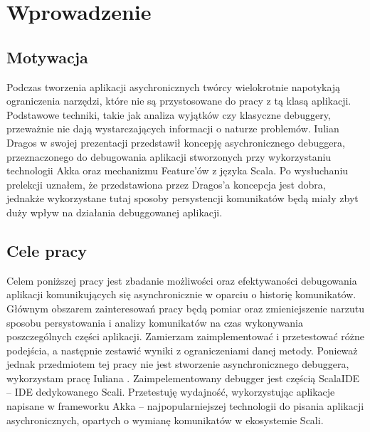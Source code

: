 \chapter{Wprowadzenie}


\section{Motywacja}

Podczas tworzenia aplikacji asychronicznych twórcy wielokrotnie napotykają ograniczenia narzędzi, które nie są przystosowane do pracy z tą klasą aplikacji. Podstawowe techniki, takie jak analiza wyjątków czy klasyczne debuggery, przeważnie nie dają wystarczających informacji o naturze problemów. Iulian Dragos w swojej prezentacji \cite{rethingningDebugger} przedstawił koncepję asychronicznego debuggera, przeznaczonego do debugowania aplikacji stworzonych przy wykorzystaniu technologii Akka oraz mechanizmu Feature'ów z języka Scala. Po wysłuchaniu prelekcji uznałem, że przedstawiona przez Dragos'a koncepcja jest dobra, jednakże wykorzystane tutaj sposoby persystencji komunikatów będą miały zbyt duży wpływ na działania debuggowanej aplikacji.



\section{Cele pracy}


Celem poniższej pracy jest zbadanie możliwości oraz efektywaności debugowania aplikacji komunikujących się asynchronicznie w oparciu o historię komunikatów. Głównym obszarem zainteresowań pracy będą pomiar oraz zmieniejszenie narzutu sposobu persystowania i analizy komunikatów na czas wykonywania poszczególnych części aplikacji. Zamierzam zaimplementować i przetestować różne podejścia, a następnie zestawić wyniki z ograniczeniami danej metody. Ponieważ jednak przedmiotem tej pracy nie jest stworzenie asynchronicznego debuggera, wykorzystam pracę Iuliana \cite{asychDebuggerGh}. Zaimpelementowany debugger jest częścią ScalaIDE – IDE dedykowanego Scali. Przetestuję wydajność, wykorzystując aplikacje napisane w frameworku Akka – najpopularniejszej technologii do pisania aplikacji asychronicznych, opartych o wymianę komunikatów w ekosystemie Scali.













